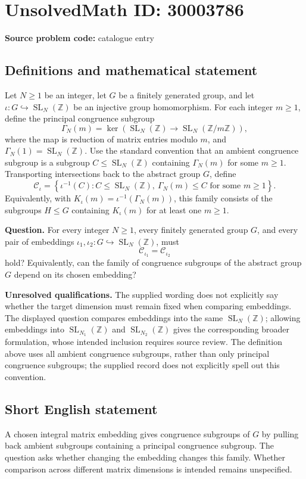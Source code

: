 \documentclass[11pt]{article}
\newcommand{\Z}{\mathbb{Z}}
\begin{document}
\section*{UnsolvedMath ID: 30003786}
\textbf{Source problem code:} catalogue entry
\subsection{Definitions and mathematical statement}
Let \(N\geq 1\) be an integer, let \(G\) be a finitely generated group, and let \(\iota:G\hookrightarrow\operatorname{SL}_N(\Z)\) be an injective group homomorphism. For each integer \(m\geq 1\), define the principal congruence subgroup
\[
\Gamma_N(m)=\ker\!\left(\operatorname{SL}_N(\Z)\longrightarrow\operatorname{SL}_N(\Z/m\Z)\right),
\]
where the map is reduction of matrix entries modulo \(m\), and \(\Gamma_N(1)=\operatorname{SL}_N(\Z)\). Use the standard convention that an ambient congruence subgroup is a subgroup \(C\leq\operatorname{SL}_N(\Z)\) containing \(\Gamma_N(m)\) for some \(m\geq 1\). Transporting intersections back to the abstract group \(G\), define
\[
\mathcal C_{\iota}=\left\{\iota^{-1}(C): C\leq\operatorname{SL}_N(\Z),\ \Gamma_N(m)\leq C\text{ for some }m\geq 1\right\}.
\]
Equivalently, with \(K_{\iota}(m)=\iota^{-1}(\Gamma_N(m))\), this family consists of the subgroups \(H\leq G\) containing \(K_{\iota}(m)\) for at least one \(m\geq 1\).

\textbf{Question.} For every integer \(N\geq 1\), every finitely generated group \(G\), and every pair of embeddings \(\iota_1,\iota_2:G\hookrightarrow\operatorname{SL}_N(\Z)\), must
\[
\mathcal C_{\iota_1}=\mathcal C_{\iota_2}
\]
hold? Equivalently, can the family of congruence subgroups of the abstract group \(G\) depend on its chosen embedding?

\textbf{Unresolved qualifications.} The supplied wording does not explicitly say whether the target dimension must remain fixed when comparing embeddings. The displayed question compares embeddings into the same \(\operatorname{SL}_N(\Z)\); allowing embeddings into \(\operatorname{SL}_{N_1}(\Z)\) and \(\operatorname{SL}_{N_2}(\Z)\) gives the corresponding broader formulation, whose intended inclusion requires source review. The definition above uses all ambient congruence subgroups, rather than only principal congruence subgroups; the supplied record does not explicitly spell out this convention.
\subsection{Short English statement}
A chosen integral matrix embedding gives congruence subgroups of \(G\) by pulling back ambient subgroups containing a principal congruence subgroup. The question asks whether changing the embedding changes this family. Whether comparison across different matrix dimensions is intended remains unspecified.
\end{document}
